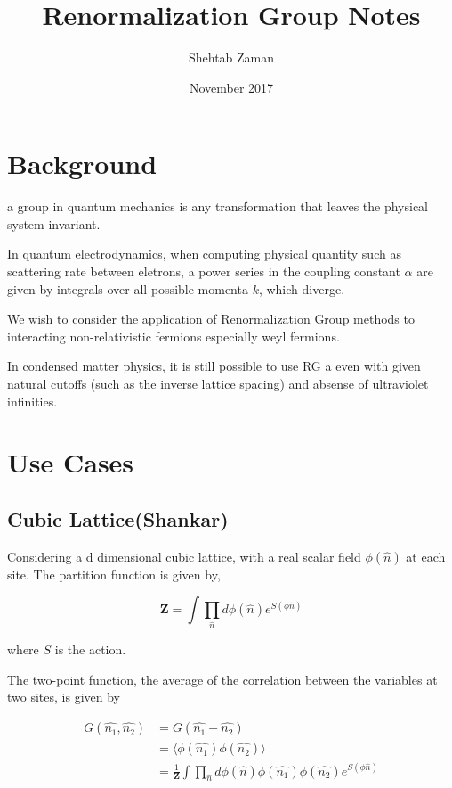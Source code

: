 \documentclass{article}
\title{Renormalization Group Notes}
\author{Shehtab Zaman }
\date{November 2017}
\begin{document}
\maketitle

\section{Background}

a group in quantum mechanics is any transformation
that leaves the physical system invariant.

In quantum electrodynamics, when computing physical quantity such
as scattering rate between eletrons, a power series in the coupling constant $\alpha $
are given by integrals over all possible momenta $ k$, which diverge.

We wish to consider the application of Renormalization Group methods to interacting
non-relativistic fermions especially weyl fermions.

In condensed matter physics, it is still possible to use RG a even with given
natural cutoffs (such as the inverse lattice spacing) and absense of ultraviolet infinities.

\section{Use Cases}

\subsection{Cubic Lattice(Shankar)}

Considering a d dimensional cubic lattice, with a real scalar field $ \phi(\hat{n})$ at
each site. The partition function is given by,

\begin{equation}
  \mathbf{Z} = \int \prod_{\hat{n}} d\phi(\hat{n}) e^{S(\phi{\hat{n}})}
\end{equation}

where $ S$ is the action.

The two-point function, the average of the correlation between the variables at two sites, is
given by

\begin{align}
  G(\hat{n_1},\hat{n_2}) &= G(\hat{n_1} - \hat{n_2}) \\
                        &= \langle \phi(\hat{n_1})\phi(\hat{n_2}) \rangle \\
                        &= \frac{1}{\mathbf{Z}} \int \prod_{\hat{n}} d\phi(\hat{n}) \phi(\hat{n_1})\phi(\hat{n_2}) e^{S(\phi{\hat{n}})}
\end{align}
\end{document}
